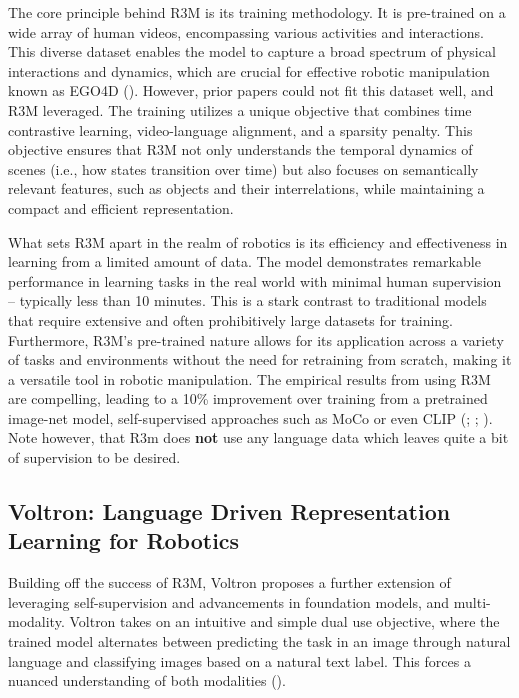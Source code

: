 \documentclass[
  letterpaper,
  DIV=11,
  numbers=noendperiod,
  oneside]{scrreprt}
\theoremstyle{remark}
\begin{document}
The core principle behind R3M is its training methodology. It is
pre-trained on a wide array of human videos, encompassing various
activities and interactions. This diverse dataset enables the model to
capture a broad spectrum of physical interactions and dynamics, which
are crucial for effective robotic manipulation known as EGO4D
(). However, prior
papers could not fit this dataset well, and R3M leveraged. The training
utilizes a unique objective that combines time contrastive learning,
video-language alignment, and a sparsity penalty. This objective ensures
that R3M not only understands the temporal dynamics of scenes (i.e., how
states transition over time) but also focuses on semantically relevant
features, such as objects and their interrelations, while maintaining a
compact and efficient representation.

What sets R3M apart in the realm of robotics is its efficiency and
effectiveness in learning from a limited amount of data. The model
demonstrates remarkable performance in learning tasks in the real world
with minimal human supervision -- typically less than 10 minutes. This
is a stark contrast to traditional models that require extensive and
often prohibitively large datasets for training. Furthermore, R3M's
pre-trained nature allows for its application across a variety of tasks
and environments without the need for retraining from scratch, making it
a versatile tool in robotic manipulation. The empirical results from
using R3M are compelling, leading to a 10\% improvement over training
from a pretrained image-net model, self-supervised approaches such as
MoCo or even CLIP (;
;
). Note however,
that R3m does \textbf{not} use any language data which leaves quite a
bit of supervision to be desired.

\subsection{Voltron: Language Driven Representation Learning for
Robotics}\label{voltron-language-driven-representation-learning-for-robotics}

Building off the success of R3M, Voltron proposes a further extension of
leveraging self-supervision and advancements in foundation models, and
multi-modality. Voltron takes on an intuitive and simple dual use
objective, where the trained model alternates between predicting the
task in an image through natural language and classifying images based
on a natural text label. This forces a nuanced understanding of both
modalities ().
\end{document}
